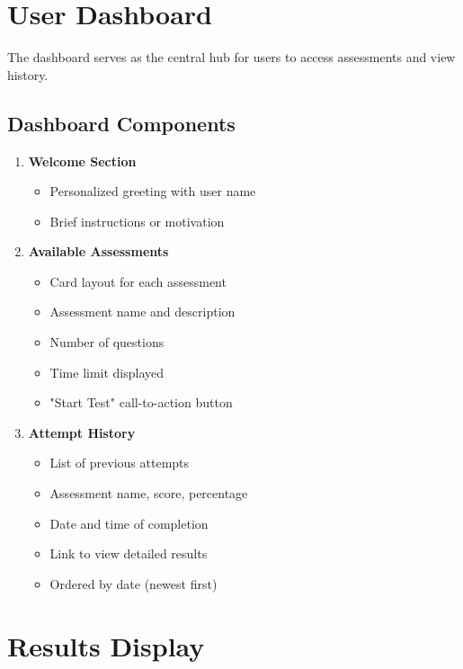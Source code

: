 \documentclass[12pt,a4paper]{report}
\begin{document}
\section{User Dashboard}

The dashboard serves as the central hub for users to access assessments and view history.

\subsection{Dashboard Components}

\begin{enumerate}
    \item \textbf{Welcome Section}
    \begin{itemize}
        \item Personalized greeting with user name
        \item Brief instructions or motivation
    \end{itemize}
    
    \item \textbf{Available Assessments}
    \begin{itemize}
        \item Card layout for each assessment
        \item Assessment name and description
        \item Number of questions
        \item Time limit displayed
        \item "Start Test" call-to-action button
    \end{itemize}
    
    \item \textbf{Attempt History}
    \begin{itemize}
        \item List of previous attempts
        \item Assessment name, score, percentage
        \item Date and time of completion
        \item Link to view detailed results
        \item Ordered by date (newest first)
    \end{itemize}
\end{enumerate}

\section{Results Display}
\end{document}
